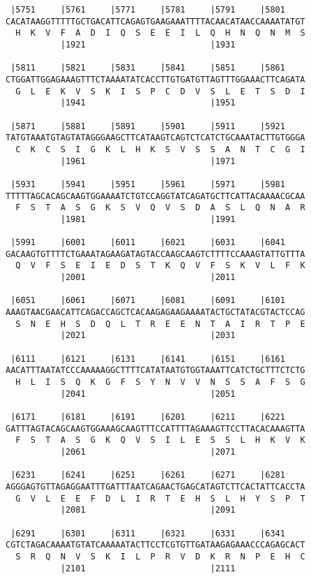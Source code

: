 \documentclass{article}
\begin{document}
\begin{Verbatim}
 |5751     |5761     |5771     |5781     |5791     |5801    
CACATAAGGTTTTTGCTGACATTCAGAGTGAAGAAATTTTACAACATAACCAAAATATGT
  H  K  V  F  A  D  I  Q  S  E  E  I  L  Q  H  N  Q  N  M  S
           |1921                         |1931              
  
 |5811     |5821     |5831     |5841     |5851     |5861    
CTGGATTGGAGAAAGTTTCTAAAATATCACCTTGTGATGTTAGTTTGGAAACTTCAGATA
  G  L  E  K  V  S  K  I  S  P  C  D  V  S  L  E  T  S  D  I
           |1941                         |1951              
  
 |5871     |5881     |5891     |5901     |5911     |5921    
TATGTAAATGTAGTATAGGGAAGCTTCATAAGTCAGTCTCATCTGCAAATACTTGTGGGA
  C  K  C  S  I  G  K  L  H  K  S  V  S  S  A  N  T  C  G  I
           |1961                         |1971              
  
 |5931     |5941     |5951     |5961     |5971     |5981    
TTTTTAGCACAGCAAGTGGAAAATCTGTCCAGGTATCAGATGCTTCATTACAAAACGCAA
  F  S  T  A  S  G  K  S  V  Q  V  S  D  A  S  L  Q  N  A  R
           |1981                         |1991              
  
 |5991     |6001     |6011     |6021     |6031     |6041    
GACAAGTGTTTTCTGAAATAGAAGATAGTACCAAGCAAGTCTTTTCCAAAGTATTGTTTA
  Q  V  F  S  E  I  E  D  S  T  K  Q  V  F  S  K  V  L  F  K
           |2001                         |2011              
  
 |6051     |6061     |6071     |6081     |6091     |6101    
AAAGTAACGAACATTCAGACCAGCTCACAAGAGAAGAAAATACTGCTATACGTACTCCAG
  S  N  E  H  S  D  Q  L  T  R  E  E  N  T  A  I  R  T  P  E
           |2021                         |2031              
  
 |6111     |6121     |6131     |6141     |6151     |6161    
AACATTTAATATCCCAAAAAGGCTTTTCATATAATGTGGTAAATTCATCTGCTTTCTCTG
  H  L  I  S  Q  K  G  F  S  Y  N  V  V  N  S  S  A  F  S  G
           |2041                         |2051              
  
 |6171     |6181     |6191     |6201     |6211     |6221    
GATTTAGTACAGCAAGTGGAAAGCAAGTTTCCATTTTAGAAAGTTCCTTACACAAAGTTA
  F  S  T  A  S  G  K  Q  V  S  I  L  E  S  S  L  H  K  V  K
           |2061                         |2071              
  
 |6231     |6241     |6251     |6261     |6271     |6281    
AGGGAGTGTTAGAGGAATTTGATTTAATCAGAACTGAGCATAGTCTTCACTATTCACCTA
  G  V  L  E  E  F  D  L  I  R  T  E  H  S  L  H  Y  S  P  T
           |2081                         |2091              
  
 |6291     |6301     |6311     |6321     |6331     |6341    
CGTCTAGACAAAATGTATCAAAAATACTTCCTCGTGTTGATAAGAGAAACCCAGAGCACT
  S  R  Q  N  V  S  K  I  L  P  R  V  D  K  R  N  P  E  H  C
           |2101                         |2111              
  

\end{Verbatim}
\end{document}
